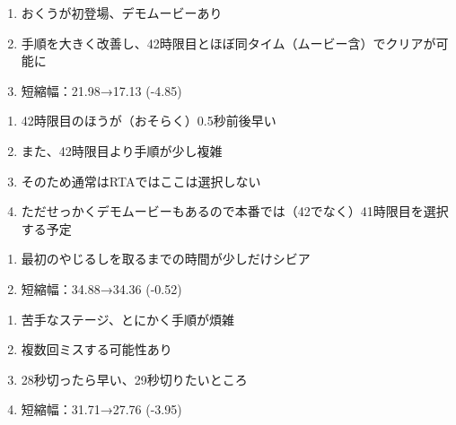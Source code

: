 \begin{enumerate}[label={\sarrow}]
\item おくうが初登場、デモムービーあり
\item 手順を大きく改善し、42時限目とほぼ同タイム（ムービー含）でクリアが可能に
\item 短縮幅：21.98→17.13 (-4.85)
\end{enumerate}
\begin{marker}
\begin{enumerate}[label={\sarrow}]
\item 42時限目のほうが（おそらく）0.5秒前後早い
\item また、42時限目より手順が少し複雑
\item そのため通常はRTAではここは選択しない
\item ただせっかくデモムービーもあるので本番では（42でなく）41時限目を選択する予定
\end{enumerate}
\end{marker}


\begin{enumerate}[label={\sarrow}]
\item 最初のやじるしを取るまでの時間が少しだけシビア
\item 短縮幅：34.88→34.36 (-0.52)
\end{enumerate}



\begin{enumerate}[label={\sarrow}]
\item 苦手なステージ、とにかく手順が煩雑
\item 複数回ミスする可能性あり
\item 28秒切ったら早い、29秒切りたいところ
\item 短縮幅：31.71→27.76 (-3.95)
\end{enumerate}



